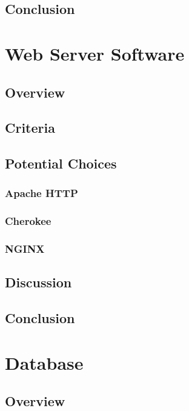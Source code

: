 \documentclass[onecolumn, draftclsnofoot,10pt, compsoc]{IEEEtran}
\begin{document}
\subsection{Conclusion}

\section{Web Server Software}

\subsection{Overview}

\subsection{Criteria}

\subsection{Potential Choices}

\subsubsection{Apache HTTP}

\subsubsection{Cherokee}

\subsubsection{NGINX}

\subsection{Discussion}

\subsection{Conclusion}

\section{Database}

\subsection{Overview}
\end{document}
